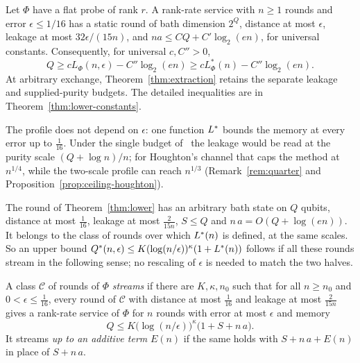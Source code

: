 \begin{theorem}\label{thm:lower}
Let $\Phi$ have a flat probe of rank $r$. A rank-rate service
with $n\geq1$ rounds and error $\epsilon\leq1/16$ has a static
round of bath dimension $2^Q$, distance at most $\epsilon$,
leakage at most $32\epsilon/(15n)$, and
$n a\leq C Q+C'\log_2(en)$, for universal constants.
Consequently, for universal $c,C''>0$,
\[
 Q\geq c L_\Phi(n,\epsilon)-C''\log_2(en)
 \geq c L^*_\Phi(n)-C''\log_2(en).
\]
At arbitrary exchange, Theorem~\ref{thm:extraction} retains the
separate leakage and supplied-purity budgets. The detailed
inequalities are in Theorem~\ref{thm:lower-constants}.
\end{theorem}

The profile does not depend on $\epsilon$: one function $L^{*}$ bounds the memory at every error up to $\frac1{16}$. Under the single budget
of~\cite[Theorem~5.2]{DouglasMghirbiB} the leakage would be read at the purity scale $(Q+\log n)/n$; for Houghton's channel that caps the method at
$n^{1/4}$, while the two-scale profile can reach $n^{1/3}$ (Remark~\ref{rem:quarter} and Proposition~\ref{prop:ceiling-houghton}).

\begin{remark}\label{rem:same-class}
The round of Theorem~\ref{thm:lower} has an arbitrary bath state on $Q$ qubits, distance at most $\frac1{16}$, leakage at most $\frac2{15n}$,
$S\le Q$ and $n\,a=O(Q+\log(en))$. It belongs to the class of rounds over which $L^{*}(n)$ is defined, at the same scales. So an upper
bound $Q^{*}(n,\epsilon)\le K(\log(n/\epsilon))^\kappa(1+L^{*}(n))$ follows if all these rounds stream in the following sense; no rescaling of $\epsilon$ is needed
to match the two halves.
\end{remark}

\begin{definition}[Streaming]\label{def:streaming}
A class $\mathcal C$ of rounds of $\Phi$ \emph{streams} if there are $K,\kappa,n_0$ such that for all $n\ge n_0$ and $0<\epsilon\le\frac1{16}$,
every round of $\mathcal C$ with distance at most $\frac1{16}$ and leakage at most $\frac2{15n}$ gives a rank-rate service of $\Phi$ for $n$ rounds
with error at most $\epsilon$ and memory
\[
Q\le K\bigl(\log(n/\epsilon)\bigr)^\kappa\bigl(1+S+n\,a\bigr).
\]
It streams \emph{up to an additive term} $E(n)$ if the same holds with $S+n\,a+E(n)$ in place of $S+n\,a$.
\end{definition}

